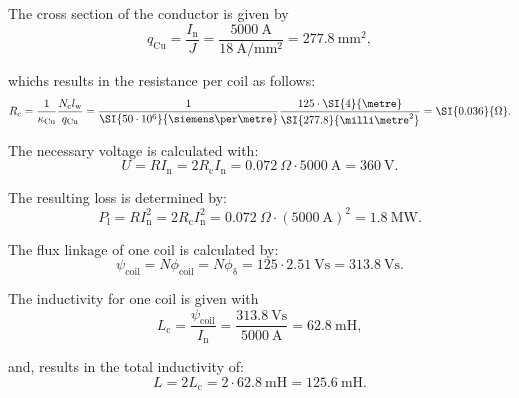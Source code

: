
\begin{solutionblock}
    The cross section of the conductor is given by
    $$ q_{\mathrm{Cu}} = \frac{I_{\mathrm{n}}}{J} = \frac{\SI{5000}{\ampere}}{\SI{18}{\ampere\per\milli\metre^2}} = \SI{277.8}{\milli\metre^2},$$

    whichs results in the resistance per coil as follows:
    $$ R_{\mathrm{c}} = \frac{1}{\kappa_{\mathrm{Cu}}} \frac{N_{\mathrm{c}}l_{\mathrm{w}}}{q_{\mathrm{Cu}}} = \frac{1}{\SI{50\cdot 10^6}{\siemens\per\metre}}\frac{125 \cdot \SI{4}{\metre}}{\SI{277.8}{\milli\metre^2}} = \SI{0.036}{\Omega}. $$
\end{solutionblock}



\begin{solutionblock}
    The necessary voltage is calculated with:
    $$ U = R I_{\mathrm{n}} = 2 R_{\mathrm{c}} I_{\mathrm{n}} = \SI{0.072}{\Omega}\cdot \SI{5000}{\ampere} = \SI{360}{\volt}. $$

    The resulting loss is determined by:
    $$ P_{\mathrm{l}} = R I_{\mathrm{n}}^2 = 2 R_{\mathrm{c}} I_{\mathrm{n}}^2 = \SI{0.072}{\Omega} \cdot (\SI{5000}{\ampere})^2 = \SI{1.8}{\mega\watt}. $$
\end{solutionblock}



\begin{solutionblock}
    The flux linkage of one coil is calculated by:
    $$ \psi_{\mathrm{coil}} = N \phi_{\mathrm{coil}} = N \phi_{\updelta} = 125 \cdot \SI{2.51}{\volt\second} = \SI{313.8}{\volt\second}.$$
\end{solutionblock}


\begin{solutionblock}
    The inductivity for one coil is given with
    $$L_{\mathrm{c}} = \frac{\psi_{\mathrm{coil}}}{I_{\mathrm{n}}} = \frac{\SI{313.8}{\volt\second}}{\SI{5000}{\ampere}} = \SI{62.8}{\milli\henry},$$

    and, results in the total inductivity of:
    $$ L = 2 L_{\mathrm{c}} = 2 \cdot \SI{62.8}{\milli\henry} = \SI{125.6}{\milli\henry}.$$
\end{solutionblock}